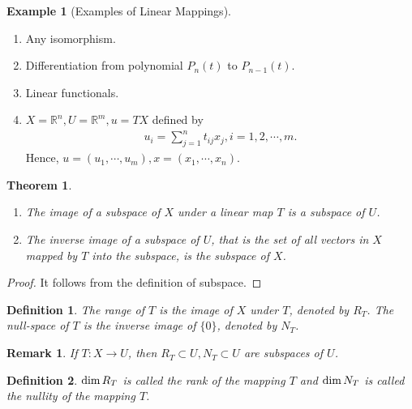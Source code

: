 \documentclass[10pt]{book}
\newtheorem{definition}{Definition}[chapter]
\newtheorem{theorem}{Theorem}[chapter]
\newtheorem{remark}{Remark}[chapter]
\theoremstyle{definition}
\newtheorem{example}{Example}[chapter]
\numberwithin{equation}{chapter}
\begin{document}
\medskip

\begin{example}[Examples of Linear Mappings]
~\begin{enumerate}[label=(\arabic*)]
    \item Any isomorphism.
    \item Differentiation from polynomial $P_n(t)$ to $P_{n-1}(t)$.
    \item Linear functionals.
    \item $X=\mathbb{R}^n, U=\mathbb{R}^m, u = TX$ defined by
    \begin{align*}
        u_i = \sum^n_{j=1}t_{ij}x_j, i = 1,2,\cdots,m.
    \end{align*}
    Hence, $u = (u_1,\cdots,u_m), x = (x_1,\cdots,x_n)$.
\end{enumerate}
\end{example}

\medskip

\begin{theorem}
~\begin{enumerate}[label=(\alph*)]
    \item The image of a subspace of $X$ under a linear map $T$ is a subspace of $U$.
    \item The inverse image of a subspace of $U$, that is the set of all vectors in $X$ mapped by $T$ into the subspace, is the subspace of $X$.
\end{enumerate}
\end{theorem}
\begin{proof}
It follows from the definition of subspace.
\end{proof}

\medskip

\begin{definition}
The range of $T$ is the image of $X$ under $T$, denoted by $R_T$. The null-space of $T$ is the inverse image of $\{0\}$, denoted by $N_T$.
\end{definition}
\begin{remark}
If $T:X\to U$, then $R_T\subset U, N_T\subset U$ are subspaces of $U$.
\end{remark}

\medskip

\begin{definition}
${\rm dim}\,R_T$ is called the rank of the mapping $T$ and ${\rm dim}\,N_T$ is called the nullity of the mapping $T$.
\end{definition}

\medskip
\end{document}
